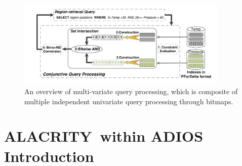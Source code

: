 \documentclass[11pt,a4paper]{article}
\newcommand{\alac}{ALACRITY}
\begin{document}
\begin{figure}[ht]             
\begin{center}                 
    \includegraphics[width=0.90\textwidth]{figures/set-intersection-overview}
\end{center}
\caption{An overview of multi-variate query processing, which is composite of multiple independent univariate query processing through bitmaps. }
\label{fig:alac-multiquery}  
\end{figure}



\section{\alac\ within ADIOS Introduction}
\end{document}
